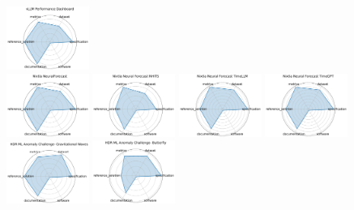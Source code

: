 \documentclass{article}
\begin{document}
\begin{figure}[ht!]
\includegraphics[width=0.2400\textwidth]{vLLM Performance Dashboard_radar.pdf}
\\[1ex]
\includegraphics[width=0.2400\textwidth]{Nixtla NeuralForecast_radar.pdf}
\includegraphics[width=0.2400\textwidth]{Nixtla Neural Forecast NHITS_radar.pdf}
\includegraphics[width=0.2400\textwidth]{Nixtla Neural Forecast TimeLLM_radar.pdf}
\includegraphics[width=0.2400\textwidth]{Nixtla Neural Forecast TimeGPT_radar.pdf}
\\[1ex]
\includegraphics[width=0.2400\textwidth]{HDR ML Anomaly Challenge- Gravitational Waves_radar.pdf}
\includegraphics[width=0.2400\textwidth]{HDR ML Anomaly Challenge- Butterfly_radar.pdf}

\end{figure}
\end{document}
